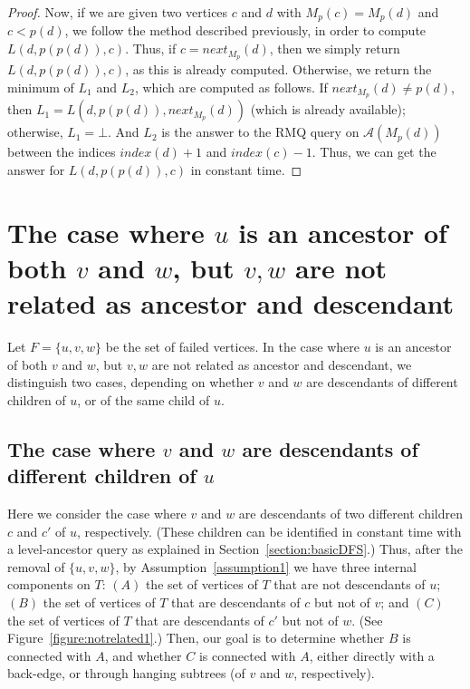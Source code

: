 \documentclass[11pt,a4paper]{article}
\begin{document}
\begin{proof}
Now, if we are given two vertices $c$ and $d$ with $M_p(c)=M_p(d)$ and $c<p(d)$, we follow the method described previously, in order to compute $L(d,p(p(d)),c)$. Thus, if $c=\mathit{next}_{M_p}(d)$, then we simply return $L(d,p(p(d)),c)$, as this is already computed. Otherwise, we return the minimum of $L_1$ and $L_2$, which are computed as follows. If $\mathit{next}_{M_p}(d)\neq p(d)$, then $L_1=L(d,p(p(d)),\mathit{next}_{M_p}(d))$ (which is already available); otherwise, $L_1=\bot$. And $L_2$ is the answer to the RMQ query on $\mathcal{A}(M_p(d))$ between the indices $\mathit{index}(d)+1$ and $\mathit{index}(c)-1$. Thus, we can get the answer for $L(d,p(p(d)),c)$ in constant time.
\end{proof}



\section{The case where $u$ is an ancestor of both $v$ and $w$, but $v,w$ are not related as ancestor and descendant}
\label{section:vwnotrelated}
Let $F=\{u,v,w\}$ be the set of failed vertices. In the case where $u$ is an ancestor of both $v$ and $w$, but $v,w$ are not related as ancestor and descendant, we distinguish two cases, depending on whether $v$ and $w$ are descendants of different children of $u$, or of the same child of $u$.

\subsection{The case where $v$ and $w$ are descendants of different children of $u$}
\label{section:vwdescendantsofcc'}
Here we consider the case where $v$ and $w$ are descendants of two different children $c$ and $c'$ of $u$, respectively. (These children can be identified in constant time with a level-ancestor query as explained in Section~\ref{section:basicDFS}.) Thus, after the removal of $\{u,v,w\}$, by Assumption~\ref{assumption1} we have three internal components on $T$: $(A)$ the set of vertices of $T$ that are not descendants of $u$; $(B)$ the set of vertices of $T$ that are descendants of $c$ but not of $v$; and $(C)$ the set of vertices of $T$ that are descendants of $c'$ but not of $w$. (See Figure~\ref{figure:notrelated1}.) Then, our goal is to determine whether $B$ is connected with $A$, and whether $C$ is connected with $A$, either directly with a back-edge, or through hanging subtrees (of $v$ and $w$, respectively).
\end{document}
